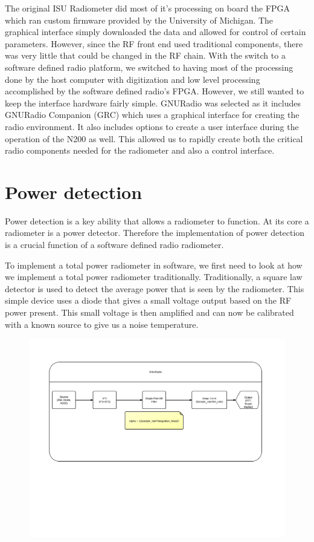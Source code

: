 The original ISU Radiometer did most of it's processing on board the FPGA which ran custom firmware provided by the University of Michigan.  The graphical interface simply downloaded the data and allowed for control of certain parameters.  However, since the RF front end used traditional components, there was very little that could be changed in the RF chain.  With the switch to a software defined radio platform, we switched to having most of the processing done by the host computer with digitization and low level processing accomplished by the software defined radio's FPGA.  However, we still wanted to keep the interface hardware fairly simple.  GNURadio was selected as it includes GNURadio Companion (GRC) which uses a graphical interface for creating the radio environment.  It also includes options to create a user interface during the operation of the N200 as well.  This allowed us to rapidly create both the critical radio components needed for the radiometer and also a control interface.

\section{Power detection}
Power detection is a key ability that allows a radiometer to function.  At its core a radiometer is a power detector.  Therefore the implementation of power detection is a crucial function of a software defined radio radiometer.

To implement a total power radiometer in software, we first need to look at how we implement a total power radiometer traditionally.  Traditionally, a square law detector is used to detect the average power that is seen by the radiometer.  This simple device uses a diode that gives a small voltage output based on the RF power present.  This small voltage is then amplified and can now be calibrated with a known source to give us a noise temperature.  

{\begin{figure}[h!tb] 
\centering
\includegraphics[width=17cm]{Images/GNURadio_Block.png}
\label{square_block}
\end{figure}
}

